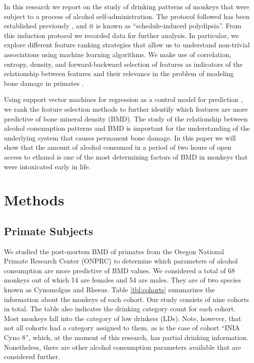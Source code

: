 \documentclass{bmcart}
\begin{document}
In this research we report on the study of drinking patterns of monkeys that
were subject to a process of alcohol self-administration. The protocol followed
has been established previously \cite{grant2008drinking}, and it is known as
``schedule-induced polydipsia''. From this induction protocol we recorded data for
further analysis. In particular, we explore different feature ranking strategies
that allow us to understand non-trivial associations using machine learning
algorithms. We make use of correlation, entropy, density, and forward-backward
selection of features as indicators of the relationship between features and
their relevance in the problem of modeling bone damage in primates \cite{guyon2008feature}.  

Using support vector machines for regression as a control model for prediction
\cite{rivas2014algorithm}, we rank
the feature selection methods to further identify which features are more
predictive of bone mineral density (BMD). The study of the relationship between
alcohol consumption patterns and BMD is important for the understanding of the
underlying system that causes permanent bone damage. In this paper we will show
that the amount of alcohol consumed in a period of two hours of open access to
ethanol is one of the most determining factors of BMD 
in monkeys that were intoxicated early in life.
 

\section*{Methods}
\subsection*{Primate Subjects}
We studied the post-mortem BMD of primates from the
Oregon  National  Primate  Research Center  (ONPRC)
to determine which parameters of alcohol consumption are more predictive of BMD
values. We considered a total of 68 monkeys out of which 14 are females and 54
are males. They are of two species known as Cynomolgus and Rhesus. Table
\ref{tbl:cohorts} summarizes the information about the monkeys of each cohort. Our 
study consists of nine cohorts in total. The table also indicates the drinking
category count for each cohort. Most monkeys fall into the category of low
drinkers (LDs). Note, however, that not all cohorts had a category assigned to
them, as is the case of cohort ``INIA Cyno 8'', which, at the moment of this
research, has partial drinking information. Nonetheless, there are other
alcohol consumption parameters available that are considered further.
\end{document}
